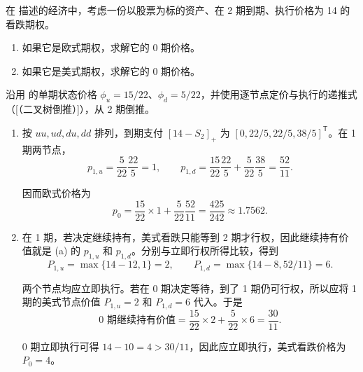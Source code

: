\begin{problem}
\WJFiveProblem{} 在 描述的经济中，考虑一份以股票为标的资产、在 2 期到期、执行价格为 14 的看跌期权。
\begin{enumerate}[label=(\alph*)]
    \item 如果它是欧式期权，求解它的 0 期价格。
    \item 如果它是美式期权，求解它的 0 期价格。
\end{enumerate}
\end{problem}
\begin{solution}[blank-type=manual,blank-vsep=9\baselineskip]

沿用 的单期状态价格 $\phi_u=15/22$、$\phi_d=5/22$，并使用逐节点定价与执行的递推式\ifdefined\WJHandoutKnowledge（[（二叉树倒推）]）\fi，从 2 期倒推。
\begin{enumerate}[label=(\alph*)]
 \item 按 $uu,ud,du,dd$ 排列，到期支付 $[14-S_2]_+$ 为 $[0,22/5,22/5,38/5]^{\mathsf T}$。在 1 期两节点，
 \[
 p_{1,u}=\frac5{22}\frac{22}{5}=1,\qquad
 p_{1,d}=\frac{15}{22}\frac{22}{5}+\frac5{22}\frac{38}{5}
 =\frac{52}{11}.
 \]

 因而欧式价格为
 \[
 p_0=\frac{15}{22}\times1+\frac5{22}\frac{52}{11}
 =\frac{425}{242}\approx1.7562.
 \]
 \item 在 1 期，若决定继续持有，美式看跌只能等到 2 期才行权，因此继续持有价值就是 (a) 的 $p_{1,u}$ 和 $p_{1,d}$。分别与立即行权所得比较，得到
 \[
 P_{1,u}=\max\{14-12,1\}=2,\qquad
 P_{1,d}=\max\{14-8,52/11\}=6.
 \]

 两个节点均应立即执行。若在 0 期决定等待，到了 1 期仍可行权，所以应将 1 期的美式节点价值 $P_{1,u}=2$ 和 $P_{1,d}=6$ 代入。于是
 \[
 \text{0 期继续持有价值}
 =\frac{15}{22}\times 2+\frac5{22}\times 6=\frac{30}{11}.
 \]

 0 期立即执行可得 $14-10=4>30/11$，因此应立即执行，美式看跌价格为 $P_0=4$。
\end{enumerate}
\end{solution}

